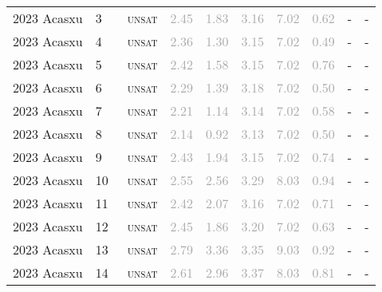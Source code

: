 \begin{center}
{\begin{longtable}{@{}llllllllll@{}}
2023 Acasxu & 3 & ~\textsc{unsat} & \textcolor{darkgray}{2.45} & \textcolor{darkgray}{1.83} & \textcolor{darkgray}{3.16} & \textcolor{darkgray}{7.02} & \textcolor{darkgray}{0.62} & - & - \\
2023 Acasxu & 4 & ~\textsc{unsat} & \textcolor{darkgray}{2.36} & \textcolor{darkgray}{1.30} & \textcolor{darkgray}{3.15} & \textcolor{darkgray}{7.02} & \textcolor{darkgray}{0.49} & - & - \\
2023 Acasxu & 5 & ~\textsc{unsat} & \textcolor{darkgray}{2.42} & \textcolor{darkgray}{1.58} & \textcolor{darkgray}{3.15} & \textcolor{darkgray}{7.02} & \textcolor{darkgray}{0.76} & - & - \\
2023 Acasxu & 6 & ~\textsc{unsat} & \textcolor{darkgray}{2.29} & \textcolor{darkgray}{1.39} & \textcolor{darkgray}{3.18} & \textcolor{darkgray}{7.02} & \textcolor{darkgray}{0.50} & - & - \\
2023 Acasxu & 7 & ~\textsc{unsat} & \textcolor{darkgray}{2.21} & \textcolor{darkgray}{1.14} & \textcolor{darkgray}{3.14} & \textcolor{darkgray}{7.02} & \textcolor{darkgray}{0.58} & - & - \\
2023 Acasxu & 8 & ~\textsc{unsat} & \textcolor{darkgray}{2.14} & \textcolor{darkgray}{0.92} & \textcolor{darkgray}{3.13} & \textcolor{darkgray}{7.02} & \textcolor{darkgray}{0.50} & - & - \\
2023 Acasxu & 9 & ~\textsc{unsat} & \textcolor{darkgray}{2.43} & \textcolor{darkgray}{1.94} & \textcolor{darkgray}{3.15} & \textcolor{darkgray}{7.02} & \textcolor{darkgray}{0.74} & - & - \\
2023 Acasxu & 10 & ~\textsc{unsat} & \textcolor{darkgray}{2.55} & \textcolor{darkgray}{2.56} & \textcolor{darkgray}{3.29} & \textcolor{darkgray}{8.03} & \textcolor{darkgray}{0.94} & - & - \\
2023 Acasxu & 11 & ~\textsc{unsat} & \textcolor{darkgray}{2.42} & \textcolor{darkgray}{2.07} & \textcolor{darkgray}{3.16} & \textcolor{darkgray}{7.02} & \textcolor{darkgray}{0.71} & - & - \\
2023 Acasxu & 12 & ~\textsc{unsat} & \textcolor{darkgray}{2.45} & \textcolor{darkgray}{1.86} & \textcolor{darkgray}{3.20} & \textcolor{darkgray}{7.02} & \textcolor{darkgray}{0.63} & - & - \\
2023 Acasxu & 13 & ~\textsc{unsat} & \textcolor{darkgray}{2.79} & \textcolor{darkgray}{3.36} & \textcolor{darkgray}{3.35} & \textcolor{darkgray}{9.03} & \textcolor{darkgray}{0.92} & - & - \\
2023 Acasxu & 14 & ~\textsc{unsat} & \textcolor{darkgray}{2.61} & \textcolor{darkgray}{2.96} & \textcolor{darkgray}{3.37} & \textcolor{darkgray}{8.03} & \textcolor{darkgray}{0.81} & - & - \\

\end{longtable}}
\end{center}
